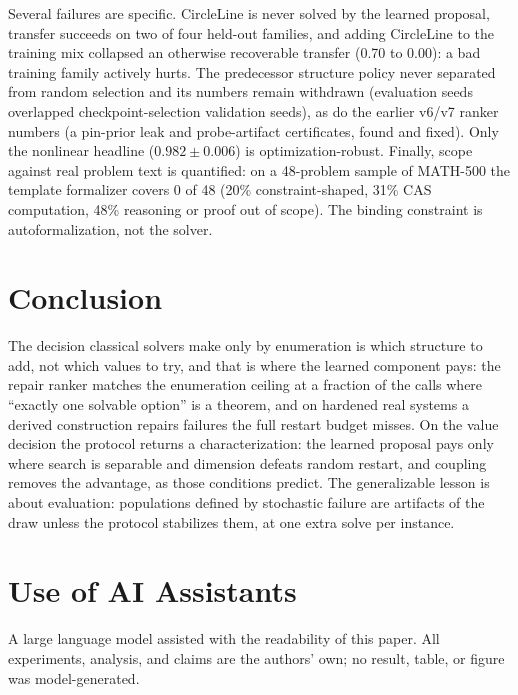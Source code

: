 \documentclass[letterpaper]{article} %
\begin{document}
Several failures are specific. CircleLine is never solved by the learned proposal, transfer
succeeds on two of four held-out families, and adding CircleLine to the training mix
collapsed an otherwise recoverable transfer (0.70 to 0.00): a bad training family actively
hurts. The predecessor structure policy never
separated from random selection and its numbers remain withdrawn (evaluation seeds
overlapped checkpoint-selection validation seeds), as do the earlier v6/v7 ranker numbers
(a pin-prior leak and probe-artifact certificates, found and fixed). Only the nonlinear headline ($0.982 \pm 0.006$) is optimization-robust.
Finally, scope against real problem text is quantified: on a 48-problem sample of
MATH-500 \citep{hendrycks2021math} the template formalizer covers 0 of 48 (20\%
constraint-shaped, 31\% CAS computation, 48\% reasoning or proof out of
scope). The binding constraint is autoformalization, not the solver.

\section{Conclusion}
\label{sec:conclusion}

The decision classical solvers make only by enumeration is which structure to add, not which
values to try, and that is where the learned component pays: the repair ranker matches the
enumeration ceiling at a fraction of the calls where ``exactly one solvable option'' is a
theorem, and on hardened real systems a derived construction repairs failures the full
restart budget misses. On the value decision the protocol returns a characterization: the
learned proposal pays only where search is separable and dimension defeats random restart,
and coupling removes the advantage, as those conditions predict. The generalizable lesson is
about evaluation: populations defined by stochastic failure are artifacts of the draw unless
the protocol stabilizes them, at one extra solve per instance.



\section*{Use of AI Assistants}
A large language model assisted with the readability of this paper. All experiments,
analysis, and claims are the authors' own; no result, table, or figure was model-generated.




\end{document}
